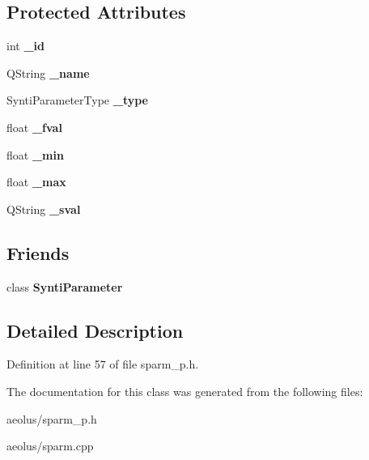 \subsection*{Protected Attributes}
\begin{DoxyCompactItemize}
\item 
\mbox{\label{class_synti_parameter_data_a6a1811772cb32fb98c671fe820c2d210}} 
int {\bfseries \+\_\+id}
\item 
\mbox{\label{class_synti_parameter_data_a455aef1e3df8d27f7b18c50a7e6cba20}} 
Q\+String {\bfseries \+\_\+name}
\item 
\mbox{\label{class_synti_parameter_data_acf8a7cc0124dc594ae08f7afcfee9dfe}} 
Synti\+Parameter\+Type {\bfseries \+\_\+type}
\item 
\mbox{\label{class_synti_parameter_data_ac0fd28507eeaa5b217982655ba0a80dd}} 
float {\bfseries \+\_\+fval}
\item 
\mbox{\label{class_synti_parameter_data_a3d58b11e4dfbc45c454dffd62b2966c0}} 
float {\bfseries \+\_\+min}
\item 
\mbox{\label{class_synti_parameter_data_ae0ad2390244f2b3381d92356e5c4d7d4}} 
float {\bfseries \+\_\+max}
\item 
\mbox{\label{class_synti_parameter_data_a2696d128fcff33ce437a3ac9935ab583}} 
Q\+String {\bfseries \+\_\+sval}
\end{DoxyCompactItemize}
\subsection*{Friends}
\begin{DoxyCompactItemize}
\item 
\mbox{\label{class_synti_parameter_data_a44b403b430169377c482bba228728265}} 
class {\bfseries Synti\+Parameter}
\end{DoxyCompactItemize}


\subsection{Detailed Description}


Definition at line 57 of file sparm\+\_\+p.\+h.



The documentation for this class was generated from the following files\+:\begin{DoxyCompactItemize}
\item 
aeolus/sparm\+\_\+p.\+h\item 
aeolus/sparm.\+cpp\end{DoxyCompactItemize}
